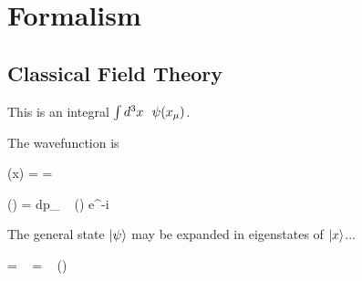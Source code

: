 \chapter{Formalism \label{chap:formalism}}

\section{Classical Field Theory}

\lipsum

This is an integral $\int d^3x ~~ \psi( x _{\mu} )$.

The wavefunction is

\be
\psi(x) = 
        = 
\ee

\be
\psi()   = \int dp_{\mu} ~ \psi() e^{-i  }
\ee

The general state $\ket{\psi}$ may be expanded in eigenstates of $\ket{x}$...

\be
\ket{\psi}  =  ~ 
            =  ~ \psi() ~ 
\ee
